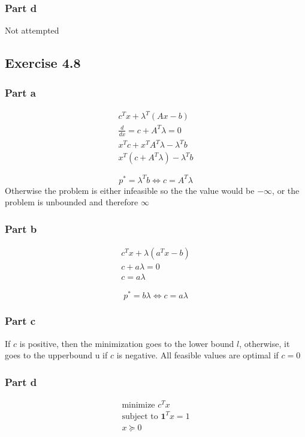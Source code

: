 \subsubsection{Part d}
Not attempted

\subsection{Exercise 4.8}
\subsubsection{Part a}
\begin{gather}
  c^T x + \lambda^T(Ax-b) \\
  \frac{d }{d x} = c + A^T \lambda = 0 \\ 
  x^T c + x^T A^T \lambda  - \lambda^T b \\
  x^T (c + A^T \lambda)  - \lambda^T b 
\end{gather}

\begin{equation}
  p^* = \lambda^T b \iff c = A^T \lambda
\end{equation}
Otherwise the problem is either infeasible so the the value would be $-\infty$, or the problem is unbounded and therefore $\infty$
\subsubsection{Part b}
\begin{gather}
  c^T x + \lambda (a^T x - b) \\
  c  + a \lambda = 0 \\
  c = a \lambda 
\end{gather}

\begin{equation}
  p^* = b \lambda \iff c = a \lambda
\end{equation}

\subsubsection{Part c}
If $c$ is positive, then the minimization goes to the lower bound $l$, otherwise, it goes to the upperbound u if $c$ is negative. All feasible values are optimal if $c = 0$

\subsubsection{Part d}
\begin{equation}
  \begin{aligned}
    \text{minimize } c^T x \\
    \text{subject to } \textbf{1}^T x = 1 \\
    x \succeq 0
  \end{aligned}
\end{equation}

